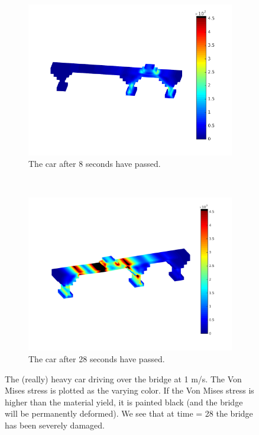 \begin{figure}[ht]
        \centering
        \begin{subfigure}[b]{0.45 \textwidth}
                \includegraphics[width=\textwidth]{time080}
                \caption{The car after 8 seconds have passed.}
        \end{subfigure}
        ~
        \begin{subfigure}[b]{0.45 \textwidth}
                \includegraphics[width=\textwidth]{time230}
                \caption{The car after 28 seconds have passed.}
        \end{subfigure}
        \caption{The (really) heavy car driving over the bridge at 1 m/s. The Von Mises stress is plotted as the varying color. If the Von Mises stress is higher than the material yield, it is painted black (and the bridge will be permanently deformed). We see that at time = 28 the bridge has been severely damaged. }
        \label{fig:bridget8t23}
\end{figure}


